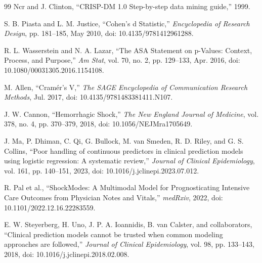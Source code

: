 \begin{thebibliography}{99}
Ncr and J. Clinton, ``CRISP-DM 1.0 Step-by-step data mining guide,'' 1999.

S. B. Piasta and L. M. Justice, ``Cohen's d Statistic,'' \textit{Encyclopedia of Research Design}, pp. 181--185, May 2010, doi: 10.4135/9781412961288.

R. L. Wasserstein and N. A. Lazar, ``The ASA Statement on p-Values: Context, Process, and Purpose,'' \textit{Am Stat}, vol. 70, no. 2, pp. 129--133, Apr. 2016, doi: 10.1080/00031305.2016.1154108.

M. Allen, ``Cramér's V,'' \textit{The SAGE Encyclopedia of Communication Research Methods}, Jul. 2017, doi: 10.4135/9781483381411.N107.

J. W. Cannon, ``Hemorrhagic Shock,'' \textit{The New England Journal of Medicine}, vol. 378, no. 4, pp. 370--379, 2018, doi: 10.1056/NEJMra1705649.

J. Ma, P. Dhiman, C. Qi, G. Bullock, M. van Smeden, R. D. Riley, and G. S. Collins, ``Poor handling of continuous predictors in clinical prediction models using logistic regression: A systematic review,'' \textit{Journal of Clinical Epidemiology}, vol. 161, pp. 140--151, 2023, doi: 10.1016/j.jclinepi.2023.07.012.

R. Pal et al., ``ShockModes: A Multimodal Model for Prognosticating Intensive Care Outcomes from Physician Notes and Vitals,'' \textit{medRxiv}, 2022, doi: 10.1101/2022.12.16.22283559.

E. W. Steyerberg, H. Uno, J. P. A. Ioannidis, B. van Calster, and collaborators, ``Clinical prediction models cannot be trusted when common modeling approaches are followed,'' \textit{Journal of Clinical Epidemiology}, vol. 98, pp. 133--143, 2018, doi: 10.1016/j.jclinepi.2018.02.008.

\end{thebibliography}
